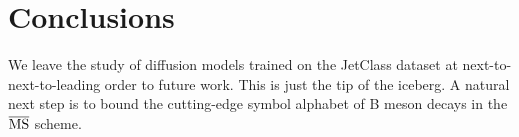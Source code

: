 \section{Conclusions}\label{sec:conclusions}

We leave the study of diffusion models trained on the JetClass dataset
at next-to-next-to-leading order to future work. This is just the tip of
the iceberg. A natural next step is to bound the cutting-edge symbol
alphabet of B meson decays in the $\overline{\rm MS}$ scheme.

